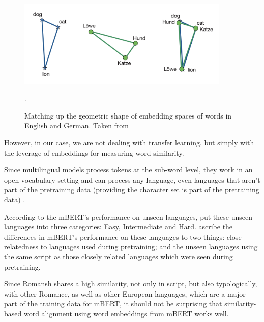 \begin{figure}[ht]
\centering
\includegraphics[width=0.9\textwidth]{graphics/embedding-alignment.png}
\caption[Matching up the geometric shape of embedding spaces of words in English and German]{Matching up the geometric shape of embedding spaces of words in English and German. 
Taken from \cite[223]{koehn-2020}}.
\label{fig:embedding-alignment}
\end{figure}

However, in our case, we are not dealing with transfer learning, but simply with the leverage of embeddings for measuring word similarity. 

Since multilingual models process tokens at the sub-word level, they work in an open vocabulary setting and can process any language, even languages that aren't part of the pretraining data (providing the character set is part of the pretraining data) \autocite{muller-et-al-2020}.

According to the mBERT's performance on unseen languages, \cite{muller-et-al-2020} put these unseen languages into three categories: Easy, Intermediate and Hard. 
\cite{muller-et-al-2020} ascribe the differences in mBERT's performance on these languages to two things: close relatedness to languages used during pretraining; and the unseen languages using the same script as those closely related languages which were seen during pretraining.

Since Romansh shares a high similarity, not only in script, but also typologically, with other Romance, as well as other European languages\footnotemark{}, which are a major part of the training data for mBERT, it should not be surprising that similarity-based word alignment using word embeddings from mBERT works well.





